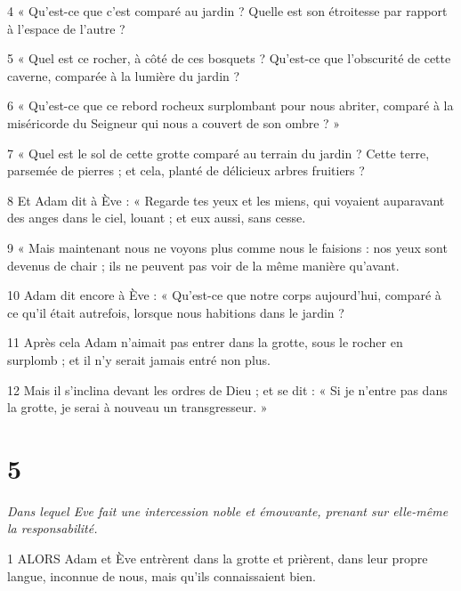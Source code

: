 \par 4 « Qu'est-ce que c'est comparé au jardin ? Quelle est son étroitesse par rapport à l’espace de l’autre ?

\par 5 « Quel est ce rocher, à côté de ces bosquets ? Qu’est-ce que l’obscurité de cette caverne, comparée à la lumière du jardin ?

\par 6 « Qu'est-ce que ce rebord rocheux surplombant pour nous abriter, comparé à la miséricorde du Seigneur qui nous a couvert de son ombre ? »

\par 7 « Quel est le sol de cette grotte comparé au terrain du jardin ? Cette terre, parsemée de pierres ; et cela, planté de délicieux arbres fruitiers ?

\par 8 Et Adam dit à Ève : « Regarde tes yeux et les miens, qui voyaient auparavant des anges dans le ciel, louant ; et eux aussi, sans cesse.

\par 9 « Mais maintenant nous ne voyons plus comme nous le faisions : nos yeux sont devenus de chair ; ils ne peuvent pas voir de la même manière qu’avant.

\par 10 Adam dit encore à Ève : « Qu'est-ce que notre corps aujourd'hui, comparé à ce qu'il était autrefois, lorsque nous habitions dans le jardin ?

\par 11 Après cela Adam n'aimait pas entrer dans la grotte, sous le rocher en surplomb ; et il n’y serait jamais entré non plus.

\par 12 Mais il s'inclina devant les ordres de Dieu ; et se dit : « Si je n’entre pas dans la grotte, je serai à nouveau un transgresseur. »

\chapter{5}

\par \textit{Dans lequel Eve fait une intercession noble et émouvante, prenant sur elle-même la responsabilité.}

\par 1 ALORS Adam et Ève entrèrent dans la grotte et prièrent, dans leur propre langue, inconnue de nous, mais qu'ils connaissaient bien.

